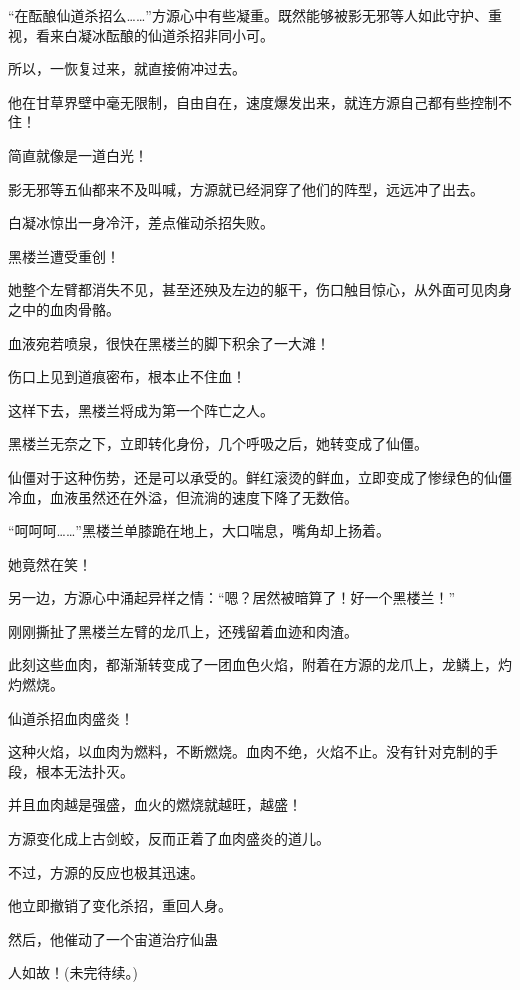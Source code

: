 \begin{this_body}
“在酝酿仙道杀招么……”方源心中有些凝重。既然能够被影无邪等人如此守护、重视，看来白凝冰酝酿的仙道杀招非同小可。

所以，一恢复过来，就直接俯冲过去。

他在甘草界壁中毫无限制，自由自在，速度爆发出来，就连方源自己都有些控制不住！

简直就像是一道白光！

影无邪等五仙都来不及叫喊，方源就已经洞穿了他们的阵型，远远冲了出去。

白凝冰惊出一身冷汗，差点催动杀招失败。

黑楼兰遭受重创！

她整个左臂都消失不见，甚至还殃及左边的躯干，伤口触目惊心，从外面可见肉身之中的血肉骨骼。

血液宛若喷泉，很快在黑楼兰的脚下积余了一大滩！

伤口上见到道痕密布，根本止不住血！

这样下去，黑楼兰将成为第一个阵亡之人。

黑楼兰无奈之下，立即转化身份，几个呼吸之后，她转变成了仙僵。

仙僵对于这种伤势，还是可以承受的。鲜红滚烫的鲜血，立即变成了惨绿色的仙僵冷血，血液虽然还在外溢，但流淌的速度下降了无数倍。

“呵呵呵……”黑楼兰单膝跪在地上，大口喘息，嘴角却上扬着。

她竟然在笑！

另一边，方源心中涌起异样之情：“嗯？居然被暗算了！好一个黑楼兰！”

刚刚撕扯了黑楼兰左臂的龙爪上，还残留着血迹和肉渣。

此刻这些血肉，都渐渐转变成了一团血色火焰，附着在方源的龙爪上，龙鳞上，灼灼燃烧。

仙道杀招血肉盛炎！

这种火焰，以血肉为燃料，不断燃烧。血肉不绝，火焰不止。没有针对克制的手段，根本无法扑灭。

并且血肉越是强盛，血火的燃烧就越旺，越盛！

方源变化成上古剑蛟，反而正着了血肉盛炎的道儿。

不过，方源的反应也极其迅速。

他立即撤销了变化杀招，重回人身。

然后，他催动了一个宙道治疗仙蛊

人如故！(未完待续。)

\end{this_body}

